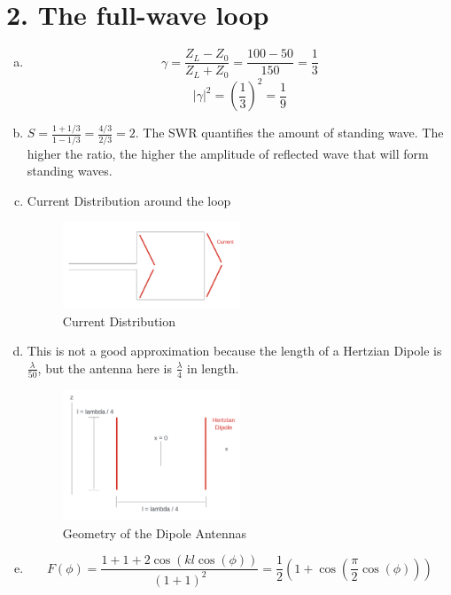 \documentclass{article} %
\begin{document}
\section*{2. The full-wave loop}
\begin{enumerate}[(a)]
      \item
            \[\gamma = \frac{Z_L - Z_0}{Z_L + Z_0} = \frac{100 - 50}{150} = \frac{1}{3}\]
            \[|\gamma|^2 = \left(\frac{1}{3}\right)^2 = \boxed{\frac{1}{9}}\]
      \item $\boxed{S = \frac{1 + 1/3}{1-1/3} = \frac{4/3}{2/3} = 2}$. The SWR quantifies the amount of standing wave. The higher the ratio, the higher the amplitude of reflected wave that will form standing waves.
      \item Current Distribution around the loop
            \begin{figure}[H]
                  \centering
                  \includegraphics[width=0.5\textwidth]{./image/figure2.png}
                  \caption{Current Distribution}
            \end{figure}
      \item This is not a good approximation because the length of a Hertzian Dipole is $\frac{\lambda}{50}$, but the antenna here is $\frac{\lambda}{4}$ in length.
            \begin{figure}[H]
                  \centering
                  \includegraphics[width=0.5\textwidth]{./image/figure3.png}
                  \caption{Geometry of the Dipole Antennas}
            \end{figure}
      \item
            \[F(\phi) = \frac{1 + 1 + 2 \cos(kl \cos(\phi))}{(1 + 1)^2} = \frac{1}{2} \left(1 + \cos\left(\frac{\pi}{2} \cos(\phi)\right)\right)\]

\end{enumerate}
\end{document}

